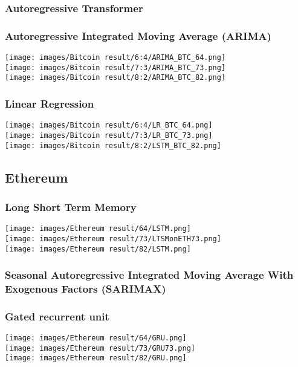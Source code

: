 \documentclass{ieeeojies}
\begin{document}
\subsubsection{Autoregressive Transformer}
\subsubsection{Autoregressive Integrated Moving Average (ARIMA)}
\texttt{[image: images/Bitcoin result/6:4/ARIMA\_BTC\_64.png]}\\
\texttt{[image: images/Bitcoin result/7:3/ARIMA\_BTC\_73.png]}\\
\texttt{[image: images/Bitcoin result/8:2/ARIMA\_BTC\_82.png]}
\subsubsection{Linear Regression}
\texttt{[image: images/Bitcoin result/6:4/LR\_BTC\_64.png]}\\
\texttt{[image: images/Bitcoin result/7:3/LR\_BTC\_73.png]}\\
\texttt{[image: images/Bitcoin result/8:2/LSTM\_BTC\_82.png]}
\subsection{Ethereum}
\subsubsection{Long Short Term Memory}
\texttt{[image: images/Ethereum result/64/LSTM.png]}\\
\texttt{[image: images/Ethereum result/73/LTSMonETH73.png]}\\
\texttt{[image: images/Ethereum result/82/LSTM.png]}\\

\subsubsection{Seasonal Autoregressive Integrated
Moving Average With Exogenous Factors
(SARIMAX)}
\subsubsection{Gated recurrent unit}
\texttt{[image: images/Ethereum result/64/GRU.png]}\\
\texttt{[image: images/Ethereum result/73/GRU73.png]}\\
\texttt{[image: images/Ethereum result/82/GRU.png]}\\
\end{document}
